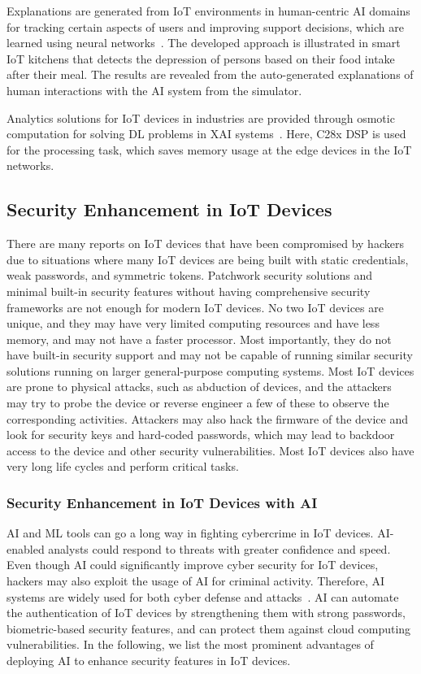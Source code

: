 \documentclass[journal]{IEEEtran}
\begin{document}
Explanations are generated from IoT environments in human-centric AI domains for tracking certain aspects of users and improving support decisions, which are learned using neural networks~\cite{garcia2019human}. The developed approach is illustrated in smart IoT kitchens that detects the depression of persons based on their food intake after their meal. The results are revealed from the auto-generated explanations of human interactions with the AI system from the simulator. 

Analytics solutions for IoT devices in industries are provided through osmotic computation for solving DL problems in XAI systems~\cite{oyekanlu2018distributed}. Here, C28x DSP is used for the processing task, which saves memory usage at the edge devices in the IoT networks. 

\subsection{Security Enhancement in IoT Devices}

There are many reports on IoT devices that have been compromised by hackers due to situations where many IoT devices are being built with static credentials, weak passwords, and symmetric tokens. Patchwork security solutions and minimal built-in security features without having comprehensive security frameworks are not enough for modern IoT devices. No two IoT devices are unique, and they may have very limited computing resources and have less memory, and may not have a faster processor. Most importantly, they do not have built-in security support and may not be capable of running similar security solutions running on larger general-purpose computing systems. Most IoT devices are prone to physical attacks, such as abduction of devices, and the attackers may try to probe the device or reverse engineer a few of these to observe the corresponding activities. Attackers may also hack the firmware of the device and look for security keys and hard-coded passwords, which may lead to backdoor access to the device and other security vulnerabilities. Most IoT devices also have very long life cycles and perform critical tasks. 

\subsubsection{Security Enhancement in IoT Devices with AI}
AI and ML tools can go a long way in fighting cybercrime in IoT devices. AI-enabled analysts could respond to threats with greater confidence and speed. Even though AI could significantly improve cyber security for IoT devices, hackers may also exploit the usage of AI for criminal activity. Therefore, AI systems are widely used for both cyber defense and attacks~\cite{rahouti2021incremental}. AI can automate the authentication of IoT devices by strengthening them with strong passwords, biometric-based security features, and can protect them against cloud computing vulnerabilities. In the following, we list the most prominent advantages of deploying AI to enhance security features in IoT devices.
\end{document}
